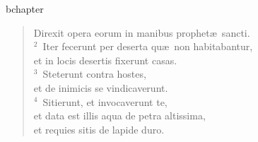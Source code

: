 bchapter\begin{flushleft}\begin{verse}\vspace{-19pt}\hspace{6pt}Direxit opera eorum in manibus prophet\ae\ sancti.\\\hspace{6pt}
${}^{2}$~Iter fecerunt per deserta qu\ae\ non habitabantur,\\ et in locis desertis fixerunt casas.\\
${}^{3}$~Steterunt contra hostes,\\ et de inimicis se vindicaverunt.\\
${}^{4}$~Sitierunt, et invocaverunt te,\\ et data est illis aqua de petra altissima,\\ et requies sitis de lapide duro.\end{verse}\end{flushleft}


